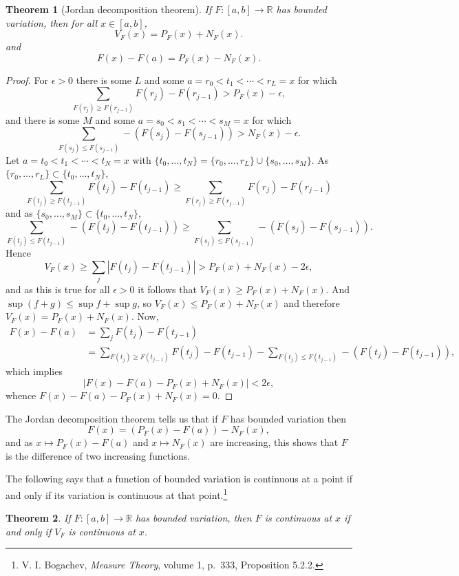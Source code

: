 \documentclass{article}
\newtheorem{theorem}{Theorem}
\theoremstyle{definition}
\begin{document}
\begin{theorem}[Jordan decomposition theorem]
If $F:[a,b] \to \mathbb{R}$ has bounded variation, then for all $x \in [a,b]$,
\[
V_F(x)=P_F(x)+N_F(x).
\]
and
\[
F(x)-F(a) = P_F(x)-N_F(x).
\]
\end{theorem}
\begin{proof}
For $\epsilon>0$ there is some $L$ and some $a=r_0<t_1<\cdots<r_L=x$ for which
\[
 \sum_{F(r_j) \geq F(r_{j-1})} F(r_j)-F(r_{j-1})>P_F(x)-\epsilon,
\]
and there is some $M$ and some $a=s_0<s_1<\cdots<s_M=x$ for which
\[
\sum_{F(s_j) \leq F(s_{j-1})} -(F(s_j)-F(s_{j-1}))>N_F(x)-\epsilon.
\]
Let $a = t_0<t_1<\cdots<t_N=x$ with $\{t_0,\ldots,t_N\} = \{r_0,\ldots,r_L\}
\cup \{s_0,\ldots,s_M\}$.
As $\{r_0,\ldots,r_L\} \subset \{t_0,\ldots,t_N\}$,
\[
 \sum_{F(t_j) \geq F(t_{j-1})} F(t_j)-F(t_{j-1}) \geq  \sum_{F(r_j) \geq F(r_{j-1})} F(r_j)-F(r_{j-1})
\]
and as $\{s_0,\ldots,s_M\} \subset \{t_0,\ldots,t_N\}$,
\[
\sum_{F(t_j) \leq F(t_{j-1})} -(F(t_j)-F(t_{j-1})) \geq \sum_{F(s_j) \leq F(s_{j-1})} -(F(s_j)-F(s_{j-1})).
\]
Hence
\[
V_F(x) \geq \sum_j |F(t_j) - F(t_{j-1})| >  P_F(x)+N_F(x) - 2\epsilon,
\]
and as this is true for all $\epsilon>0$ it follows that  $V_F(x) \geq P_F(x)+N_F(x)$. And $\sup (f+g) \leq \sup f + \sup g$, so
$V_F(x) \leq P_F(x)+N_F(x)$ and therefore $V_F(x)=P_F(x)+N_F(x)$.
Now,
\begin{align*}
F(x)-F(a) &= \sum_j F(t_j)-F(t_{j-1})\\
& = \sum_{F(t_j) \geq F(t_{j-1})} F(t_j)-F(t_{j-1})
-\sum_{F(t_j) \leq  F(t_{j-1})} -(F(t_j)-F(t_{j-1})),
\end{align*}
which implies
\[
|F(x)-F(a)-P_F(x)+N_F(x)| < 2\epsilon,
\]
whence $F(x)-F(a) - P_F(x) + N_F(x)=0$. 
\end{proof}

The Jordan decomposition theorem tells us that if $F$ has bounded variation then
\[
F(x) = (P_F(x)-F(a)) - N_F(x),
\]
and as $x \mapsto P_F(x)-F(a)$ and $x \mapsto N_F(x)$ are increasing, this shows that
$F$ is the difference of two increasing functions. 


The following says that a function of bounded variation is continuous at a point
if and only if its variation is continuous at that point.\footnote{V. I. Bogachev, {\em Measure Theory}, volume 1, p.~333, Proposition 5.2.2.}

\begin{theorem}
If $F:[a,b] \to \mathbb{R}$ has bounded variation, then $F$ is continuous at $x$ if and
only if $V_F$ is continuous at $x$. 
\label{continuity}
\end{theorem}
\end{document}
